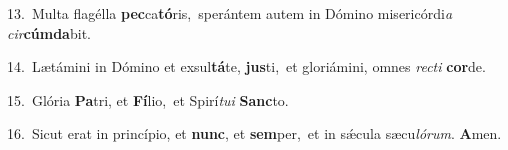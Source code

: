 {\numbfont\textcolor{\numbcolor}{13.}}~Multa flagélla \textbf{pec}\-ca\-\textbf{tó}\-ris,~\star sperántem autem in Dómino misericórdi\textit{a} \textit{cir}\-\textbf{cúm}\textbf{da}bit.\par
{\numbfont\textcolor{\numbcolor}{14.}}~Lætámini in Dómino et exsul\-\textbf{tá}\-te, \textbf{jus}\-ti,~\star et gloriámini, omnes \textit{rec}\-\textit{ti} \textbf{cor}\-de.\par
{\numbfont\textcolor{\numbcolor}{15.}}~Glória \textbf{Pa}\-tri, et \textbf{Fí}\-lio,~\star et Spirí\-\textit{tu}\-\textit{i} \textbf{Sanc}\-to.\par
{\numbfont\textcolor{\numbcolor}{16.}}~Sicut erat in princípio, et \textbf{nunc}\-, et \textbf{sem}\-per,~\star et in sǽcula sæcu\-\textit{ló}\-\textit{rum}. \textbf{A}\-men.\par
